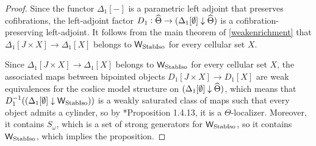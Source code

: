 \begin{proof}Since the functor \(\Delta_1[-]\) is a parametric left adjoint that preserves cofibrations, the left-adjoint factor \(D_1:\widehat{\Theta} \to {(\Delta_1[\emptyset]\downarrow \ensuremath{\widehat{\Theta}})}\) is a cofibration-preserving left-adjoint.  It follows from the main theorem of \eqref{weakenrichment} that \(\Delta_1[J\times X] \to \Delta_1[X]\) belongs to \(\mathsf{W}_{\operatorname{StabIso}}\) for every cellular set \(X\).

Since \(\Delta_1[J\times X]\to \Delta_1[X]\) belongs to \(\mathsf{W}_{\operatorname{StabIso}}\) for every cellular set \(X\), the associated maps between bipointed objects \(D_1[J\times X]\to D_1[X]\) are weak equivalences for the coslice model structure on \({(\Delta_1[\emptyset]\downarrow \widehat{\Theta})}\), which means that \(D_1^{-1}({(\Delta_1[\emptyset]\downarrow \mathsf{W}_{\operatorname{StabIso}})})\) is a weakly saturated class of maps such that every object admits a cylinder, so by \cite{cisinski-book}*{Proposition 1.4.13}, it is a \(\Theta\)-localizer.  Moreover, it contains \(S_\omega\), which is a set of strong generators for \(\mathsf{W}_{\operatorname{StabIso}}\), so it contains \(\mathsf{W}_{\operatorname{StabIso}}\), which implies the proposition.   
\end{proof}

